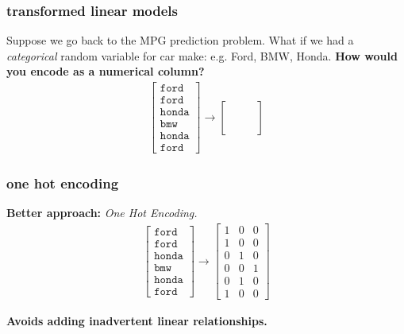 \documentclass[handout,compress]{beamer}
\begin{document}
\begin{frame}
	\frametitle{transformed linear models}
	Suppose we go back to the MPG prediction problem. What if we had a \emph{categorical} random variable for car make: e.g. Ford, BMW, Honda. \textbf{How would you encode as a numerical column?}
		\begin{align*}
		\begin{bmatrix}
		\texttt{ford} \\\texttt{ford} \\ \texttt{honda} \\ \texttt{bmw} \\ \texttt{honda} \\ \texttt{ford}
		\end{bmatrix} \rightarrow 
		\begin{bmatrix}
		\hspace{2em} \\\hspace{2em} \\ \hspace{2em} \\ \hspace{2em} \\ \hspace{2em} \\ \hspace{2em}
		\end{bmatrix}
		\end{align*}
\end{frame}

\begin{frame}
	\frametitle{one hot encoding}
	\textbf{Better approach:} \emph{One Hot Encoding.}
			\begin{align*}
	\begin{bmatrix}
	\texttt{ford} \\\texttt{ford} \\ \texttt{honda} \\ \texttt{bmw} \\ \texttt{honda} \\ \texttt{ford}
	\end{bmatrix} \rightarrow 
	\begin{bmatrix}
	1 & 0 & 0 \\1 & 0 & 0 \\ 0 & 1 & 0 \\ 0 & 0 & 1\\ 0 & 1 & 0 \\ 1 & 0 & 0
	\end{bmatrix}
	\end{align*}
	\begin{center}
		\alert{\textbf{Avoids adding inadvertent linear relationships.}}
	\end{center}
\end{frame}
\end{document}
